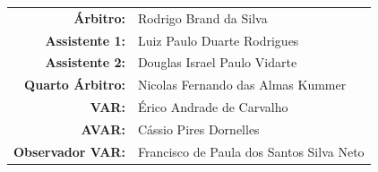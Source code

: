 \documentclass[11pt]{article}
\newcommand{\teamjersey}{}
\begin{document}
\vspace{0.5cm}
\begin{minipage}{0.65\textwidth}
\begin{center}
\begin{tabular}{rl}
\textbf{Árbitro:} & Rodrigo Brand da Silva \\
\textbf{Assistente 1:} & Luiz Paulo Duarte Rodrigues \\
\textbf{Assistente 2:} & Douglas Israel Paulo Vidarte \\
\textbf{Quarto Árbitro:} & Nicolas Fernando das Almas Kummer \\
\textbf{VAR:} & Érico Andrade de Carvalho \\
\textbf{AVAR:} & Cássio Pires Dornelles \\
\textbf{Observador VAR:} & Francisco de Paula dos Santos Silva Neto \\
\end{tabular}
\end{center}
\end{minipage}
\begin{minipage}{0.3\textwidth}
\end{minipage}
\newpage
\vspace{0.5cm}
\renewcommand{\teamjersey}{../assets/camisa/costas1.png}
\end{document}
